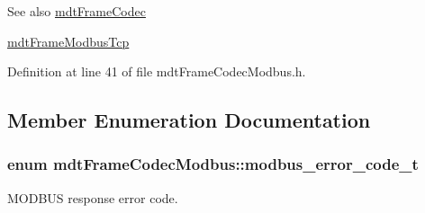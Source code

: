 \begin{DoxySeeAlso}{See also}
\hyperlink{classmdt_frame_codec}{mdtFrameCodec} 

\hyperlink{classmdt_frame_modbus_tcp}{mdtFrameModbusTcp} 
\end{DoxySeeAlso}


Definition at line 41 of file mdtFrameCodecModbus.h.



\subsection{Member Enumeration Documentation}
\hypertarget{classmdt_frame_codec_modbus_a31d8291be7f8636d5d295ce3066d7ac7}{
\subsubsection[{modbus\_\-error\_\-code\_\-t}]{\setlength{\rightskip}{0pt plus 5cm}enum {\bf mdtFrameCodecModbus::modbus\_\-error\_\-code\_\-t}}}
\label{classmdt_frame_codec_modbus_a31d8291be7f8636d5d295ce3066d7ac7}


MODBUS response error code. 

